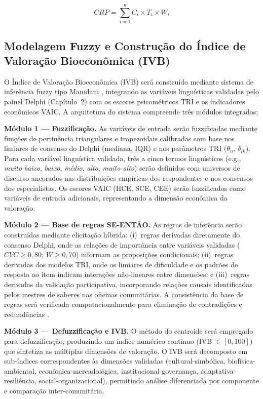 \begin{equation}
CRP = \sum_{i=1}^{n} C_i \times T_i \times W_i
\end{equation}

\subsection{Modelagem Fuzzy e Construção do Índice de Valoração Bioeconômica (IVB)}

O Índice de Valoração Bioeconômica (IVB) será construído mediante sistema de inferência fuzzy tipo Mamdani \cite{Mamdani1975}, integrando as variáveis linguísticas validadas pelo painel Delphi (Capítulo~2) com os escores psicométricos TRI e os indicadores econômicos VAIC. A arquitetura do sistema compreende três módulos integrados:

\textbf{Módulo 1 --- Fuzzificação.} As variáveis de entrada serão fuzzificadas mediante funções de pertinência triangulares e trapezoidais calibradas com base nos limiares de consenso do Delphi (mediana, IQR) e nos parâmetros TRI ($\theta_n$, $\delta_{ik}$). Para cada variável linguística validada, três a cinco termos linguísticos (e.g., \textit{muito baixo}, \textit{baixo}, \textit{médio}, \textit{alto}, \textit{muito alto}) serão definidos com universos de discurso ancorados nas distribuições empíricas dos respondentes e nos consensos dos especialistas. Os escores VAIC (HCE, SCE, CEE) serão fuzzificados como variáveis de entrada adicionais, representando a dimensão econômica da valoração.

\textbf{Módulo 2 --- Base de regras SE-ENTÃO.} As regras de inferência serão construídas mediante elicitação híbrida: (i)~regras derivadas diretamente do consenso Delphi, onde as relações de importância entre variáveis validadas ($CVC \geq 0,80$; $W \geq 0,70$) informam as proposições condicionais; (ii)~regras derivadas dos modelos TRI, onde os limiares de dificuldade e os padrões de resposta ao item indicam interações não-lineares entre dimensões; e (iii)~regras derivadas da validação participativa, incorporando relações causais identificadas pelos mestres de saberes nas oficinas comunitárias. A consistência da base de regras será verificada computacionalmente para eliminação de contradições e redundâncias \cite{Zadeh1965}.

\textbf{Módulo 3 --- Defuzzificação e IVB.} O método do centroide será empregado para defuzzificação, produzindo um índice numérico contínuo (IVB $\in [0, 100]$) que sintetiza as múltiplas dimensões de valoração. O IVB será decomposto em sub-índices correspondentes às dimensões validadas (cultural-simbólica, biofísica-ambiental, econômica-mercadológica, institucional-governança, adaptativa-resiliência, social-organizacional), permitindo análise diferenciada por componente e comparação inter-comunitária.

